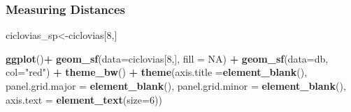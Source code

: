 \documentclass[
  shownotes,
  xcolor={svgnames},
  hyperref={colorlinks,citecolor=DarkBlue,linkcolor=DarkRed,urlcolor=DarkBlue}
   , aspectratio=169]{beamer}
\newenvironment{Shaded}{\begin{snugshade}}{\end{snugshade}}
\newcommand{\DataTypeTok}[1]{\textcolor[rgb]{0.13,0.29,0.53}{#1}}
\newcommand{\DecValTok}[1]{\textcolor[rgb]{0.00,0.00,0.81}{#1}}
\newcommand{\KeywordTok}[1]{\textcolor[rgb]{0.13,0.29,0.53}{\textbf{#1}}}
\newcommand{\NormalTok}[1]{#1}
\newcommand{\OperatorTok}[1]{\textcolor[rgb]{0.81,0.36,0.00}{\textbf{#1}}}
\newcommand{\OtherTok}[1]{\textcolor[rgb]{0.56,0.35,0.01}{#1}}
\newcommand{\StringTok}[1]{\textcolor[rgb]{0.31,0.60,0.02}{#1}}
\begin{document}
\begin{frame}[fragile]
\frametitle{Measuring Distances}


\begin{minipage}[t]{0.52\linewidth}
        \begin{scriptsize}
\begin{Shaded}
\begin{Highlighting}[]
\NormalTok{ciclovias\_sp\textless{}{-}ciclovias[}\DecValTok{8}\NormalTok{,]}

\KeywordTok{ggplot}\NormalTok{()}\OperatorTok{+}
\StringTok{  }\KeywordTok{geom\_sf}\NormalTok{(}\DataTypeTok{data=}\NormalTok{ciclovias[}\DecValTok{8}\NormalTok{,], }\DataTypeTok{fill =} \OtherTok{NA}\NormalTok{) }\OperatorTok{+}
\StringTok{  }\KeywordTok{geom\_sf}\NormalTok{(}\DataTypeTok{data=}\NormalTok{db, }\DataTypeTok{col=}\StringTok{"red"}\NormalTok{) }\OperatorTok{+}
\StringTok{  }\KeywordTok{theme\_bw}\NormalTok{() }\OperatorTok{+}
\StringTok{  }\KeywordTok{theme}\NormalTok{(}\DataTypeTok{axis.title =}\KeywordTok{element\_blank}\NormalTok{(),}
        \DataTypeTok{panel.grid.major =} \KeywordTok{element\_blank}\NormalTok{(),}
        \DataTypeTok{panel.grid.minor =} \KeywordTok{element\_blank}\NormalTok{(),}
        \DataTypeTok{axis.text =} \KeywordTok{element\_text}\NormalTok{(}\DataTypeTok{size=}\DecValTok{6}\NormalTok{))}
\end{Highlighting}
\end{Shaded}
  \end{scriptsize}
    \end{minipage}
    \hfill
    \begin{minipage}[t]{0.43\linewidth}%
       \medskip
        \begin{figure}[H] \centering
            \captionsetup{justification=centering}

\end{figure}
\end{minipage}
\end{frame}
\end{document}
